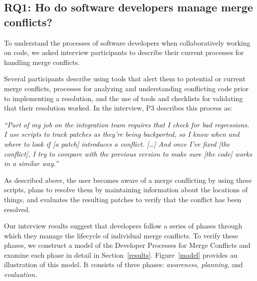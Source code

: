 
\subsection{\textbf{RQ1:} Ho do software developers manage merge conflicts?}\label{RQ1}

To understand the processes of software developers when collaboratively working on code, we asked interview participants to describe their current processes for handling merge conflicts.

Several participants describe using tools that alert them to potential or current merge conflicts, processes for analyzing and understanding conflicting code prior to implementing a resolution, and the use of tools and checklists for validating that their resolution worked.
In the interview, P3 describes this process as:
\begin{quoting}
\textit{``Part of my job on the integration team requires that I check for bad regressions. I use scripts to track patches as they're being backported, so I know when and where to look if [a patch] introduces a conflict. [\ldots] And once I've fixed [the conflict], I try to compare with the previous version to make sure [the code] works in a similar way.''}
\end{quoting}
As described above, the user becomes aware of a merge conflicting by using these scripts, plans to resolve them by maintaining information about the locations of things, and evaluates the resulting patches to verify that the conflict has been resolved.

Our interview results suggest that developers follow a series of phases through which they manage the lifecycle of individual merge conflicts.
To verify these phases, we construct a model of the Developer Processes for Merge Conflicts and examine each phase in detail in Section~\ref{results}.
Figure~\ref{model} provides an illustration of this model. 
It consists of three phases: \emph{awareness, planning,} and \emph{evaluation.}

